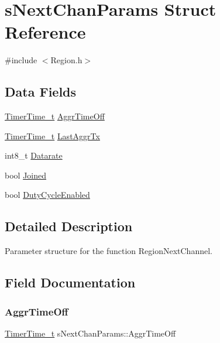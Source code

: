 \hypertarget{structsNextChanParams}{}\section{s\+Next\+Chan\+Params Struct Reference}
\label{structsNextChanParams}


{\ttfamily \#include $<$Region.\+h$>$}

\subsection*{Data Fields}
\begin{DoxyCompactItemize}
\item 
\hyperlink{utilities_8h_a4215ca43d3e953099ea758ce428599d0}{Timer\+Time\+\_\+t} \hyperlink{structsNextChanParams_abec6dac3f04a69dda9e6f8175b3ae022}{Aggr\+Time\+Off}
\item 
\hyperlink{utilities_8h_a4215ca43d3e953099ea758ce428599d0}{Timer\+Time\+\_\+t} \hyperlink{structsNextChanParams_a4f5d9417759fa1ef8b3103ef04d54829}{Last\+Aggr\+Tx}
\item 
int8\+\_\+t \hyperlink{structsNextChanParams_aecc50a3a952bd990553b873dc6858393}{Datarate}
\item 
bool \hyperlink{structsNextChanParams_a147c9e2910dd7f22b8378e80d9b383ef}{Joined}
\item 
bool \hyperlink{structsNextChanParams_a3afdcbe5a3dba77f73c7534957b82ce5}{Duty\+Cycle\+Enabled}
\end{DoxyCompactItemize}


\subsection{Detailed Description}
Parameter structure for the function Region\+Next\+Channel. 

\subsection{Field Documentation}
\mbox{\label{structsNextChanParams_abec6dac3f04a69dda9e6f8175b3ae022}} 
\subsubsection{\texorpdfstring{Aggr\+Time\+Off}{AggrTimeOff}}
{\footnotesize\ttfamily \hyperlink{utilities_8h_a4215ca43d3e953099ea758ce428599d0}{Timer\+Time\+\_\+t} s\+Next\+Chan\+Params\+::\+Aggr\+Time\+Off}

